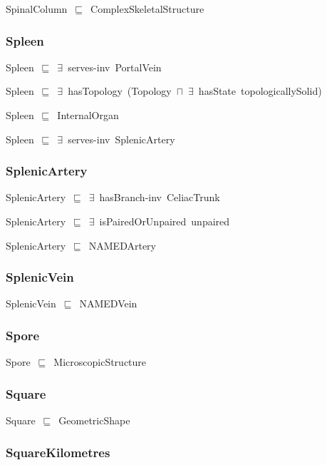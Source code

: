 \documentclass{article}
\begin{document}
SpinalColumn~\ensuremath{\sqsubseteq}~ComplexSkeletalStructure~

\subsubsection*{Spleen}

Spleen~\ensuremath{\sqsubseteq}~\ensuremath{\exists}~serves-inv~PortalVein~

Spleen~\ensuremath{\sqsubseteq}~\ensuremath{\exists}~hasTopology~(Topology~\ensuremath{\sqcap}~\ensuremath{\exists}~hasState~topologicallySolid)~

Spleen~\ensuremath{\sqsubseteq}~InternalOrgan~

Spleen~\ensuremath{\sqsubseteq}~\ensuremath{\exists}~serves-inv~SplenicArtery~

\subsubsection*{SplenicArtery}

SplenicArtery~\ensuremath{\sqsubseteq}~\ensuremath{\exists}~hasBranch-inv~CeliacTrunk~

SplenicArtery~\ensuremath{\sqsubseteq}~\ensuremath{\exists}~isPairedOrUnpaired~unpaired~

SplenicArtery~\ensuremath{\sqsubseteq}~NAMEDArtery~

\subsubsection*{SplenicVein}

SplenicVein~\ensuremath{\sqsubseteq}~NAMEDVein~

\subsubsection*{Spore}

Spore~\ensuremath{\sqsubseteq}~MicroscopicStructure~

\subsubsection*{Square}

Square~\ensuremath{\sqsubseteq}~GeometricShape~

\subsubsection*{SquareKilometres}
\end{document}
